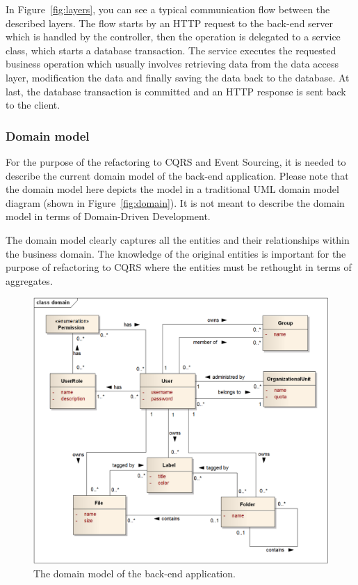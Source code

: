 \documentclass{book}
\begin{document}
In Figure~\ref{fig:layers}, you can see a typical communication flow
between the described layers. The flow starts by an HTTP request to the
back-end server which is handled by the controller, then the operation
is delegated to a service class, which starts a database transaction.
The service executes the requested business operation which usually
involves retrieving data from the data access layer, modification the
data and finally saving the data back to the database. At last, the
database transaction is committed and an HTTP response is sent back to
the client.


\subsubsection{Domain model}\label{domain-model}

For the purpose of the refactoring to CQRS and Event Sourcing, it is
needed to describe the current domain model of the back-end application.
Please note that the domain model here depicts the model in a
traditional UML domain model diagram (shown in Figure~\ref{fig:domain}).
It is not meant to describe the domain model in terms of Domain-Driven
Development.

The domain model clearly captures all the entities and their
relationships within the business domain. The knowledge of the original
entities is important for the purpose of refactoring to CQRS where the
entities must be rethought in terms of aggregates.


\begin{figure}[h!]
\begin{center}
\includegraphics[width=0.98\columnwidth]{figures/domain/domain}
\caption{The domain model of the back-end application.%
}
\end{center}
\end{figure}
\end{document}
